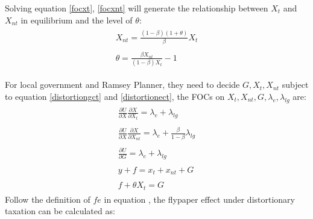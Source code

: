 Solving equation \ref{focxt}, \ref{focxnt} will generate the relationship between $X_t$ and $X_{nt}$ in equilibrium and the level of $\theta$:
\begin{align}
    \begin{split}
        X_{nt}=\frac{(1-\beta)(1+\theta)}{\beta}X_t \label{xtxnt}
    \end{split} \\
    \begin{split}
        \theta=\frac{\beta X_{n t}}{(1-\beta) X_t}-1 \label{theta}
    \end{split}
\end{align}

For local government and Ramsey Planner, they need to decide $G, X_t, X_{nt}$ subject to equation \ref*{distortiongct} and \ref*{distortionect}, the FOCs on $X_t, X_{nt}, G, \lambda_e, \lambda_{lg}$ are:
\begin{align}
    \begin{split}
        \frac{\partial U}{\partial X} \frac{\partial X}{\partial X_t}=\lambda_e+\lambda_{l g}
    \end{split}                                                       \\
    \begin{split}
        \frac{\partial U}{\partial X} \frac{\partial X}{\partial X_{nt}}=\lambda_e +\frac{\beta}{1-\beta} \lambda_{l g}
    \end{split} \\
    \begin{split}
        \frac{\partial U}{\partial G}=\lambda_e+\lambda_{l g}
    \end{split}                                                                                       \\
    \begin{split}
        y+f=x_t+x_{nt}+G
    \end{split}                                                                                                                            \\
    \begin{split}
        f+\theta X_t=G
    \end{split}
\end{align}
Follow the definition of $fe$ in equation \label{mfe}, the flypaper effect under distortionary taxation can be calculated as:

